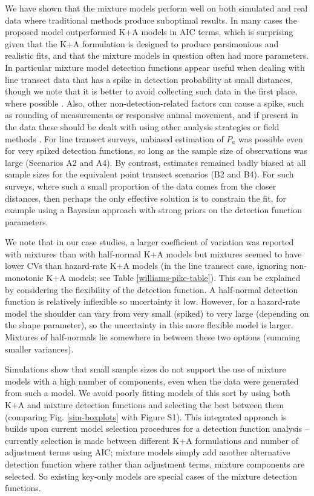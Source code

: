 \documentclass[10pt]{article}
\begin{document}
We have shown that the mixture models perform well on both simulated and real data where traditional methods produce suboptimal results. In many cases the proposed model outperformed K+A models in AIC terms, which is surprising given that the K+A formulation is designed to produce parsimonious and realistic fits, and that the mixture models in question often had more parameters. In particular mixture model detection functions appear useful when dealing with line transect data that has a spike in detection probability at small distances, though we note that it is better to avoid collecting such data in the first place, where possible \cite{Buckland:2001vm}.  Also, other non-detection-related factors can cause a spike, such as rounding of measurements or responsive animal movement, and if present in the data these should be dealt with using other analysis strategies or field methods \cite{Buckland:2001vm}.  For line transect surveys, unbiased estimation of $P_a$ was possible even for very spiked detection functions, so long as the sample size of observations was large (Scenarios A2 and A4).  By contrast, estimates remained badly biased at all sample sizes for the equivalent point transect scenarios (B2 and B4). For such surveys, where such a small proportion of the data comes from the closer distances, then perhaps the only effective solution is to constrain the fit, for example using a Bayesian approach with strong priors on the detection function parameters.

We note that in our case studies, a larger coefficient of variation was reported with mixtures than with half-normal K+A models but mixtures seemed to have lower CVs than hazard-rate K+A models (in the line transect case, ignoring non-monotonic K+A models; see Table \ref{williams-pike-table}). This can be explained by considering the flexibility of the detection function. A half-normal detection function is relatively inflexible so uncertainty it low. However, for a hazard-rate model the shoulder can vary from very small (spiked) to very large (depending on the shape parameter), so the uncertainty in this more flexible model is larger. Mixtures of half-normals lie somewhere in between these two options (summing smaller variances). 

Simulations show that small sample sizes do not support the use of mixture models with a high number of components, even when the data were generated from such a model. We avoid poorly fitting models of this sort by using both K+A and mixture detection functions and selecting the best between them (comparing Fig. \ref{sim-boxplots} with Figure S1). This integrated approach is builds upon current model selection procedures for a detection function analysis -- currently selection is made between different K+A formulations and number of adjustment terms using AIC; mixture models simply add another alternative detection function where rather than adjustment terms, mixture components are selected. So existing key-only models are special cases of the mixture detection functions.
\end{document}
